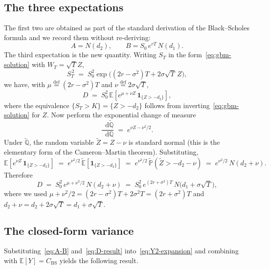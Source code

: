 \documentclass[11pt,a4paper]{article}
\theoremstyle{plain}
\theoremstyle{definition}
\theoremstyle{remark}
\newcommand{\E}{\mathbb{E}}
\newcommand{\Prob}{\mathbb{P}}
\newcommand{\Q}{\mathbb{Q}}
\newcommand{\dd}{\mathop{}\!\mathrm{d}}
\newcommand{\eqdef}{\overset{\mathrm{def}}{=}}
\newcommand{\one}{\mathbf{1}}
\begin{document}
\subsection{The three expectations}

The first two are obtained as part of the standard derivation of the
Black--Scholes formula and we record them without re-deriving:
\begin{equation}
\label{eq:A-B}
A = N(d_2),
\qquad
B = S_0\, e^{rT}\, N(d_1).
\end{equation}
The third expectation is the new quantity. Writing $S_T$ in the
form~\eqref{eq:gbm-solution} with $W_T = \sqrt{T} Z$,
\[
S_T^{\,2}
\;=\; S_0^2 \exp\!\big(
(2r - \sigma^2) T + 2\sigma\sqrt{T}\, Z
\big),
\]
we have, with $\mu \eqdef (2r - \sigma^2) T$ and $\nu \eqdef
2\sigma\sqrt{T}$,
\begin{equation}
\label{eq:D-step1}
D \;=\; S_0^2\, \E\!\left[
e^{\mu + \nu Z}\, \one_{\{Z > -d_2\}}
\right],
\end{equation}
where the equivalence $\{S_T > K\} = \{Z > -d_2\}$ follows from
inverting~\eqref{eq:gbm-solution} for $Z$. Now perform the
exponential change of measure
\begin{equation}
\frac{\dd \tilde{\Q}}{\dd \Q} \;=\; e^{\nu Z - \nu^2/2}.
\end{equation}
Under $\tilde{\Q}$, the random variable $\tilde{Z} = Z - \nu$ is
standard normal (this is the elementary form of the Cameron--Martin
theorem). Substituting,
\[
\E\!\left[ e^{\nu Z}\, \one_{\{Z > -d_2\}} \right]
\;=\; e^{\nu^2/2}\, \tilde{\E}\!\left[ \one_{\{Z > -d_2\}} \right]
\;=\; e^{\nu^2/2}\, \tilde{\Prob}(\tilde{Z} > -d_2 - \nu)
\;=\; e^{\nu^2/2}\, N(d_2 + \nu).
\]
Therefore
\begin{equation}
\label{eq:D-result}
D \;=\; S_0^2\, e^{\mu + \nu^2/2}\, N(d_2 + \nu)
\;=\; S_0^2\, e^{(2r + \sigma^2) T}\, N\!\big(d_1 + \sigma\sqrt{T}\big),
\end{equation}
where we used $\mu + \nu^2/2 = (2r - \sigma^2)T + 2\sigma^2 T
= (2r + \sigma^2)T$ and
$d_2 + \nu = d_2 + 2\sigma\sqrt{T} = d_1 + \sigma\sqrt{T}$.

\subsection{The closed-form variance}

Substituting~\eqref{eq:A-B} and~\eqref{eq:D-result}
into~\eqref{eq:Y2-expansion} and combining with $\E[Y] = C_{\mathrm{BS}}$
yields the following result.
\end{document}
